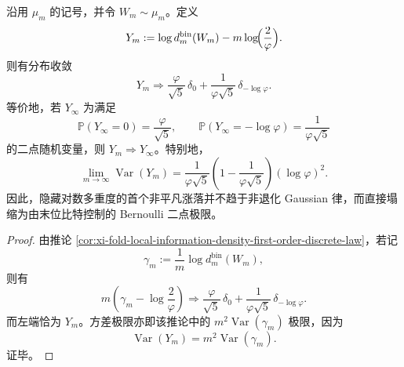 \begin{corollary}[隐藏对数多重度涨落收敛为末位支配的二点律]\label{cor:xi-fold-hidden-logmultiplicity-branchbit-two-point-law}
沿用 \(\mu_m\) 的记号，并令 \(W_m\sim\mu_m\)。定义
\[
Y_m:=\log d_m^{\mathrm{bin}}(W_m)-m\log\!\Bigl(\frac{2}{\varphi}\Bigr).
\]
则有分布收敛
\[
\boxed{\;
Y_m\Longrightarrow
\frac{\varphi}{\sqrt5}\,\delta_0
+\frac{1}{\varphi\sqrt5}\,\delta_{-\log\varphi}.\;}
\]
等价地，若 \(Y_\infty\) 为满足
\[
\mathbb P(Y_\infty=0)=\frac{\varphi}{\sqrt5},
\qquad
\mathbb P(Y_\infty=-\log\varphi)=\frac{1}{\varphi\sqrt5}
\]
的二点随机变量，则 \(Y_m\Rightarrow Y_\infty\)。特别地，
\[
\boxed{\;
\lim_{m\to\infty}\operatorname{Var}(Y_m)
=
\frac{1}{\varphi\sqrt5}
\left(1-\frac{1}{\varphi\sqrt5}\right)(\log\varphi)^2.\;}
\]
因此，隐藏对数多重度的首个非平凡涨落并不趋于非退化 Gaussian 律，而直接塌缩为由末位比特控制的 Bernoulli 二点极限。
\end{corollary}
\begin{proof}
由推论 \ref{cor:xi-fold-local-information-density-first-order-discrete-law}，若记
\[
\gamma_m:=\frac{1}{m}\log d_m^{\mathrm{bin}}(W_m),
\]
则有
\[
m\left(\gamma_m-\log\!\frac{2}{\varphi}\right)\Longrightarrow
\frac{\varphi}{\sqrt5}\,\delta_0
+\frac{1}{\varphi\sqrt5}\,\delta_{-\log\varphi}.
\]
而左端恰为 \(Y_m\)。方差极限亦即该推论中的 \(m^2\operatorname{Var}(\gamma_m)\) 极限，因为
\[
\operatorname{Var}(Y_m)=m^2\operatorname{Var}(\gamma_m).
\]
证毕。
\end{proof}



